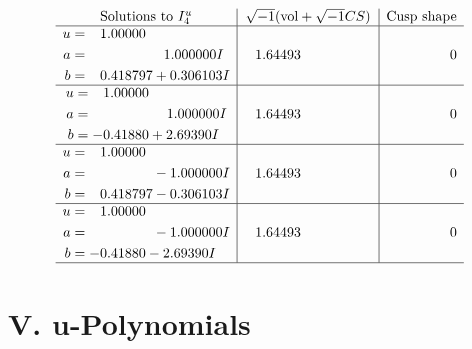 \documentclass[1p]{elsarticle_modified}
\theoremstyle{definition}
\newcommand{\I}{\sqrt{-1}}
\begin{document}
$$\begin{array}{c|c|c}  
\text{Solutions to }I^u_{4}& \I (\text{vol} + \sqrt{-1}CS) & \text{Cusp shape}\\
 \hline 
\begin{aligned}
u &= \phantom{-}1.00000\phantom{ +0.000000I} \\
a &= \phantom{-0.000000 -}1.000000 I \\
b &= \phantom{-}0.418797 + 0.306103 I\end{aligned}
 & \phantom{-}1.64493\phantom{ +0.000000I} & \phantom{-0.000000 } 0 \\ \hline\begin{aligned}
u &= \phantom{-}1.00000\phantom{ +0.000000I} \\
a &= \phantom{-0.000000 -}1.000000 I \\
b &= -0.41880 + 2.69390 I\end{aligned}
 & \phantom{-}1.64493\phantom{ +0.000000I} & \phantom{-0.000000 } 0 \\ \hline\begin{aligned}
u &= \phantom{-}1.00000\phantom{ +0.000000I} \\
a &= \phantom{-0.000000 } -1.000000 I \\
b &= \phantom{-}0.418797 - 0.306103 I\end{aligned}
 & \phantom{-}1.64493\phantom{ +0.000000I} & \phantom{-0.000000 } 0 \\ \hline\begin{aligned}
u &= \phantom{-}1.00000\phantom{ +0.000000I} \\
a &= \phantom{-0.000000 } -1.000000 I \\
b &= -0.41880 - 2.69390 I\end{aligned}
 & \phantom{-}1.64493\phantom{ +0.000000I} & \phantom{-0.000000 } 0\\
 \hline 
 \end{array}$$\newpage
\newpage\renewcommand{\arraystretch}{1}
\centering \section*{ V. u-Polynomials}
\end{document}
